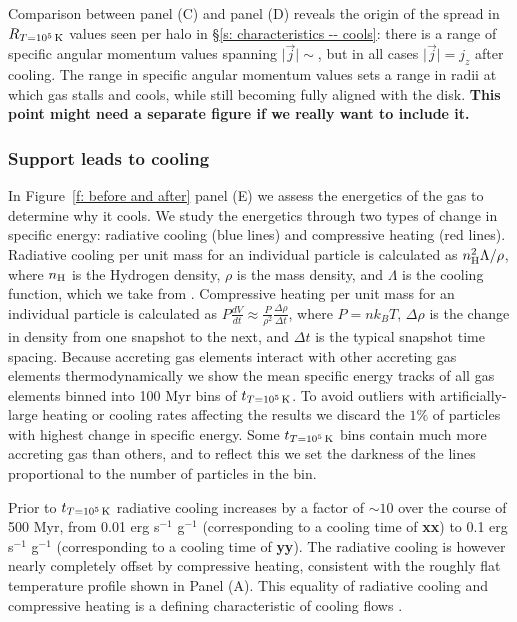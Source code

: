 \documentclass[fleqn,usenatbib]{mnras}
\newcommand{\Rcon}{R_{T=10^5\,{\rm K}}}
\newcommand{\tcon}{t_{T=10^5\,{\rm K}}}
\newcommand{\nH}{n_{\rm H}}
\begin{document}
Comparison between panel (C) and panel (D) reveals the origin of the spread in $\Rcon$ values seen per halo in \S\ref{s: characteristics -- cools}:
there is a range of specific angular momentum values spanning $\mid\vec j\mid \sim$, but in all cases $\mid\vec j\mid = j_z$ after cooling.
The range in specific angular momentum values sets a range in radii at which gas stalls and cools, while still becoming fully aligned with the disk.
\textbf{
This point might need a separate figure if we really want to include it.
}


\subsubsection{Support leads to cooling}
\label{s: mechanics -- energy balance}

In Figure~\ref{f: before and after} panel (E) we assess the energetics of the gas to determine why it cools.
We study the energetics through two types of change in specific energy: radiative cooling (blue lines) and compressive heating (red lines).
Radiative cooling per unit mass for an individual particle is calculated as $\nH^2 \Lambda / \rho$, where $\nH$ is the Hydrogen density, $\rho$ is the mass density, and $\Lambda$ is the cooling function, which we take from \cite{Wiersma2009a}.
Compressive heating per unit mass for an individual particle is calculated as $P \frac{dV}{dt} \approx \frac{ P }{ \rho^2 } \frac{ \Delta \rho }{ \Delta t }$, where $P = n k_B T$, $\Delta \rho$ is the change in density from one snapshot to the next, and $\Delta t$ is the typical snapshot time spacing.
Because accreting gas elements interact with other accreting gas elements thermodynamically we show the mean specific energy tracks of all gas elements binned into 100 Myr bins of $\tcon$.
To avoid outliers with artificially-large heating or cooling rates affecting the results we discard the $1\%$ of particles with highest change in specific energy.
Some $\tcon$ bins contain much more accreting gas than others, and to reflect this we set the darkness of the lines proportional to the number of particles in the bin.

Prior to $\tcon$ radiative cooling increases by a factor of $\sim 10$ over the course of 500 Myr, from 0.01 erg s$^{-1}$ g$^{-1}$ (corresponding to a cooling time of \textbf{xx}) to 0.1 erg s$^{-1}$ g$^{-1}$ (corresponding to a cooling time of \textbf{yy}).
The radiative cooling is however nearly completely offset by compressive heating, consistent with the roughly flat temperature profile shown in Panel (A).
This equality of radiative cooling and compressive heating is a defining characteristic of cooling flows \citep{Mathews78, McNamara2007, Stern20}. 
\end{document}
